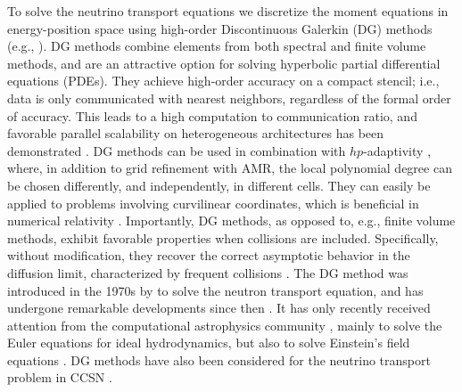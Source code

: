\documentclass[11pt,letterpaper,twoside,english,final]{article}
\begin{document}
To solve the neutrino transport equations we discretize the moment equations in energy-position space using high-order Discontinuous Galerkin (DG) methods (e.g., \cite{cockburnShu_2001,hesthavenWarburton_2008}).  
DG methods combine elements from both spectral and finite volume methods, and are an attractive option for solving hyperbolic partial differential equations (PDEs).  
They achieve high-order accuracy on a compact stencil; i.e., data is only communicated with nearest neighbors, regardless of the formal order of accuracy.  
This leads to a high computation to communication ratio, and favorable parallel scalability on heterogeneous architectures has been demonstrated \citep{klockner_etal_2009}.  
DG methods can be used in combination with $hp$-adaptivity \citep{remacle_etal_2003}, where, in addition to grid refinement with AMR, the local polynomial degree can be chosen differently, and independently, in different cells.  
They can easily be applied to problems involving curvilinear coordinates, which is beneficial in numerical relativity \citep{teukolsky_2016}.  
Importantly, DG methods, as opposed to, e.g., finite volume methods, exhibit favorable properties when collisions are included.  
Specifically, without modification, they recover the correct asymptotic behavior in the diffusion limit, characterized by frequent collisions \citep[e.g.,][]{larsenMorel_1989,adams_2001,guermondKanschat_2010}.  
The DG method was introduced in the 1970s by \citet{reedHill_1973} to solve the neutron transport equation, and has undergone remarkable developments since then \citep[see, e.g.,][and references therein]{shu_2016}.  
It has only recently received attention from the computational astrophysics community \citep[e.g.,][]{radiceRezzolla_2011,schaal_etal_2015,wuTang_2017}, mainly to solve the Euler equations for ideal hydrodynamics, but also to solve Einstein's field equations \citep{teukolsky_2016}.  
DG methods have also been considered for the neutrino transport problem in CCSN \citep[e.g.,][]{radice_etal_2013,endeve_etal_2015}.  
\end{document}

